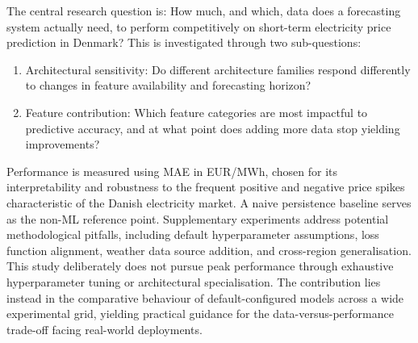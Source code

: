 The central research question is: How much, and which,
data does a forecasting system actually need, to perform
competitively on short-term electricity price prediction in
Denmark?
This is investigated through two sub-questions:
\begin{enumerate}
	\item Architectural sensitivity: Do different architecture families respond 
	differently to changes in feature availability
	and forecasting horizon?
	\item Feature contribution: Which feature categories are most
	impactful to predictive accuracy, and at what point does
	adding more data stop yielding improvements?
\end{enumerate}
Performance is measured using MAE in EUR/MWh, chosen
for its interpretability and robustness to the frequent positive and negative 
price spikes characteristic of the Danish
electricity market. A naive persistence baseline 
serves
as the non-ML reference point. Supplementary experiments
address potential methodological pitfalls, including default
hyperparameter assumptions, loss function alignment, weather
data source addition, and cross-region generalisation.
This study deliberately does not pursue peak performance
through exhaustive hyperparameter tuning or architectural
specialisation. The contribution lies instead in the comparative behaviour of 
default-configured models across a wide
experimental grid, yielding practical guidance for the data-versus-performance 
trade-off facing real-world deployments.


